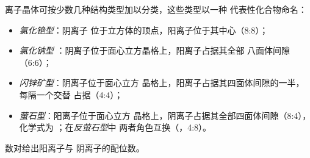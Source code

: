 \begin{definition}[结构类型]\label{def:b1:crystals-ionic-covalent:structure-type}
离子晶体可按少数几种结构类型加以分类，这些类型以一种
代表性化合物命名：
\begin{itemize}
  \item \emph{氯化铯型}：阴离子
        位于立方体的顶点，阳离子位于其中心（8:8）；
  \item \emph{氯化钠型}
        ：阴离子位于面心立方晶格上，阳离子占据其全部
        八面体间隙（6:6）；
  \item \emph{闪锌矿型}：阴离子位于面心立方
        晶格上，阳离子占据其四面体间隙的一半，每隔一个交替
        占据（4:4）；
  \item \emph{萤石型}：阳离子位于面心立方
        晶格上，阴离子占据其全部四面体间隙（8:4），化学式为
        ；在\emph{反萤石型}中
        两者角色互换（，4:8）。
\end{itemize}
数对给出阳离子与
阴离子的配位数。
\end{definition}

